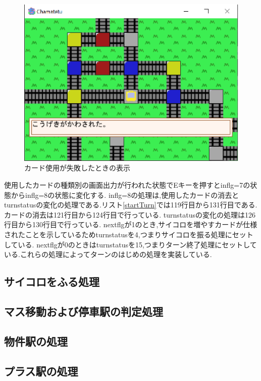 \documentclass[a4j]{jarticle}
\begin{document}
                \begin{figure}[H]
                \centering
                \includegraphics[scale=1.3]{hirari.eps}
                \caption{カード使用が失敗したときの表示}
                 \label{c9}
                \end{figure}

    使用したカードの種類別の画面出力が行われた状態でEキーを押すとinflg=7の状態からinflg=8の状態に変化する.
    inflg=8の処理は,使用したカードの消去とturnstatusの変化の処理である.リスト\ref{startTurn}では119行目から131行目である.
    カードの消去は121行目から124行目で行っている. turnstatusの変化の処理は126行目から130行目で行っている.
    nextflgが1のとき,サイコロを増やすカードが仕様されたことを示しているためturnstatusを4,つまりサイコロを振る処理にセットしている.
    nextflgが0のときはturnstatusを15,つまりターン終了処理にセットしている.これらの処理によってターンのはじめの処理を実装している.

    \subsection{サイコロをふる処理}
    \subsection{マス移動および停車駅の判定処理}
    \subsection{物件駅の処理}
    \subsection{プラス駅の処理}
\end{document}
